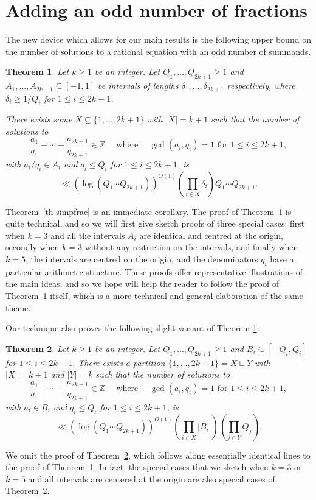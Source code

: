 \documentclass[11pt,letterpaper]{amsart}
\newcommand{\bbz}{\mathbb{Z}}
\newcommand{\abs}[1]{\left\lvert #1\right\rvert}
\newcommand{\brac}[1]{\left( #1\right)}
\newcommand{\ogcd}[2]{\gcd(#1,#2)}
\newtheorem{theorem}{Theorem}
\theoremstyle{definition}
\begin{document}
\section{Adding an odd number of fractions}\label{sec-fractions}

The new device which allows for our main results is the following upper bound on the number of solutions to a rational equation with an odd number of summands.

\begin{theorem}\label{th-oddsum}
Let $k\geq 1$ be an integer. Let $Q_1,\ldots,Q_{2k+1}\geq 1$ and $A_1,\ldots,A_{2k+1}\subseteq [-1,1]$ be intervals of lengths $\delta_1,\ldots,\delta_{2k+1}$ respectively, where $\delta_i\geq 1/Q_i$ for $1\leq i\leq 2k+1$. 

There exists some $X\subseteq \{1,\ldots,2k+1\}$ with $\abs{X}=k+1$ such that the number of solutions to
\[\frac{a_1}{q_1}+\cdots+\frac{a_{2k+1}}{q_{2k+1}}\in \bbz\quad\textrm{ where }\quad\ogcd{a_i}{q_i}=1\textrm{ for }1\leq i\leq 2k+1,\] 
with $a_i/q_i\in A_i$ and $q_i\leq Q_i$ for $1\leq i\leq 2k+1$, is
\[\ll (\log(Q_1\cdots Q_{2k+1}))^{O(1)}\brac{\prod_{i\in X}\delta_i}Q_1\cdots Q_{2k+1}.\]
\end{theorem}

Theorem~\ref{th-simpfrac} is an immediate corollary. The proof of Theorem~\ref{th-oddsum} is quite technical, and so we will first give sketch proofs of three special cases: first when $k=3$ and all the intervals $A_i$ are identical and centred at the origin, secondly when $k=3$ without any restriction on the intervals, and finally when $k=5$, the intervals are centred on the origin, and the denominators $q_i$ have a particular arithmetic structure. These proofs offer representative illustrations of the main ideas, and so we hope will help the reader to follow the proof of Theorem~\ref{th-oddsum} itself, which is a more technical and general elaboration of the same theme.

Our technique also proves the following slight variant of Theorem \ref{th-oddsum}:
\begin{theorem}\label{th-oddsum-n-within-sets}
Let $k \geq 1$ be an integer. Let $Q_1, \ldots, Q_{2k+1} \geq 1$ and $B_i \subseteq [-Q_i,Q_i]$ for $1 \le i \le 2k+1$. There exists a partition $\{1, \ldots, 2k+1\} = X \sqcup Y$ with $|X| = k+1$ and $|Y| = k$ such that the number of solutions to
\[\frac{a_1}{q_1}+\cdots+\frac{a_{2k+1}}{q_{2k+1}}\in \bbz\quad\textrm{ where }\quad\ogcd{a_i}{q_i}=1\textrm{ for }1\leq i\leq 2k+1,\] 
with $a_i\in B_i$ and $q_i\leq Q_i$ for $1\leq i\leq 2k+1$, is
\[\ll (\log(Q_1\cdots Q_{2k+1}))^{O(1)}\brac{\prod_{i\in X}|B_i|}\brac{\prod_{j \in Y} Q_j}.\]
\end{theorem}
We omit the proof of Theorem~\ref{th-oddsum-n-within-sets}, which follows along essentially identical lines to the proof of Theorem~\ref{th-oddsum}. In fact, the special cases that we sketch when $k = 3$ or $k=5$ and all intervals are centered at the origin are also special cases of Theorem~\ref{th-oddsum-n-within-sets}.
\end{document}

